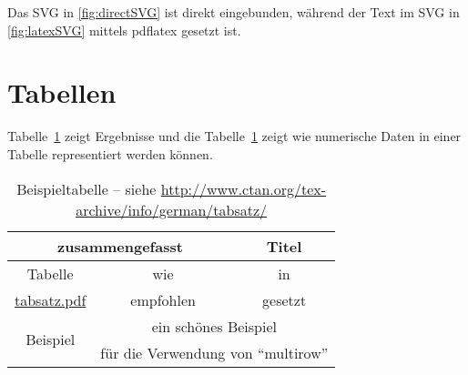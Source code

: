 Das SVG in \cref{fig:directSVG} ist direkt eingebunden, während der Text im SVG in \cref{fig:latexSVG} mittels pdflatex gesetzt ist.

\iffalse %
\begin{figure}
\centering
\texttt{[image: svgexample.svg]}
\caption{SVG direkt eingebunden}
\label{fig:directSVG}
\end{figure}

\begin{figure}
\centering
\def\svgwidth{.4\textwidth}

\caption{Text im SVG mittels \LaTeX{} gesetzt}
\label{fig:latexSVG}
\end{figure}
\fi %

\section{Tabellen}

Tabelle~\ref{tab:Ergebnisse} zeigt Ergebnisse und die Tabelle~\ref{tab:Ergebnisse} zeigt wie numerische Daten in einer Tabelle representiert werden können.
\begin{table}
  \begin{center}
    \begin{tabular}{ccc}
    \toprule
    \multicolumn{2}{c}{\textbf{zusammengefasst}} & \textbf{Titel} \\ \midrule
    Tabelle & wie & in \\
    \url{tabsatz.pdf}& empfohlen & gesetzt\\

    \multirow{2}{*}{Beispiel} & \multicolumn{2}{c}{ein schönes Beispiel}\\
     & \multicolumn{2}{c}{für die Verwendung von \enquote{multirow}}\\
    \bottomrule
    \end{tabular}
    \caption[Beispieltabelle]{Beispieltabelle -- siehe \url{http://www.ctan.org/tex-archive/info/german/tabsatz/}}
    \label{tab:Ergebnisse}
  \end{center}
\end{table}

